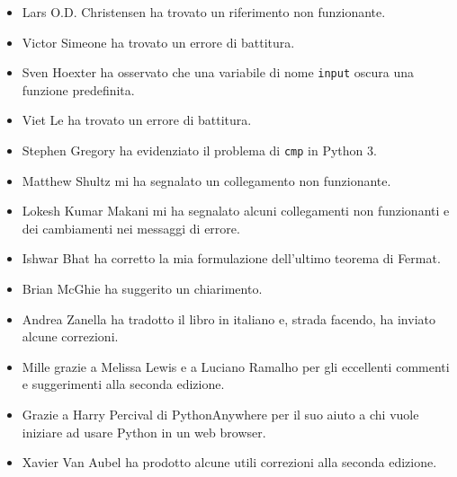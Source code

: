 \documentclass[10pt]{book}
\begin{document}
\begin{itemize}
\item Lars O.D. Christensen ha trovato un riferimento non funzionante.

\item Victor Simeone ha trovato un errore di battitura.

\item Sven Hoexter ha osservato che una variabile di nome {\tt input}
oscura una funzione predefinita.

\item Viet Le ha trovato un errore di battitura.

\item Stephen Gregory ha evidenziato il problema di {\tt cmp} in Python 3.

\item Matthew Shultz mi ha segnalato un collegamento non funzionante.

\item Lokesh Kumar Makani mi ha segnalato alcuni collegamenti non funzionanti e dei cambiamenti nei messaggi di errore.

\item Ishwar Bhat ha corretto la mia formulazione dell'ultimo teorema di Fermat.

\item Brian McGhie ha suggerito un chiarimento.

\item Andrea Zanella ha tradotto il libro in italiano e, strada facendo, ha inviato alcune correzioni.

\item Mille grazie a Melissa Lewis e a Luciano Ramalho per gli eccellenti commenti e suggerimenti alla seconda edizione.

\item Grazie a Harry Percival di PythonAnywhere per il suo aiuto a chi vuole iniziare ad usare Python in un web browser.

\item Xavier Van Aubel ha prodotto alcune utili correzioni alla seconda edizione.


\end{itemize}

\normalsize
\clearemptydoublepage

\begin{latexonly}

\tableofcontents

\clearemptydoublepage

\end{latexonly}
\end{document}
